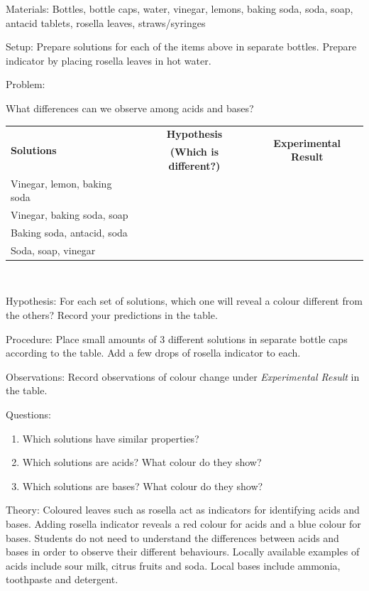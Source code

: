 \begin{description*}
\item[Materials:]{Bottles, bottle caps, water, vinegar, lemons, baking soda, soda, soap, antacid tablets, rosella leaves, straws/syringes}
\item[Setup:]{Prepare solutions for each of the items above in separate bottles. Prepare indicator by placing rosella leaves in hot water.}\\
\item[Problem:]{What differences can we observe among acids and bases?\\

\begin{tabular}{|l|c|c|} \hline
\multirow{2}{*}{\textbf{Solutions}} & \textbf{Hypothesis} & \multirow{2}{*}{\textbf{Experimental Result}} \\
& \textbf{(Which is different?)} & \\ \hline
Vinegar, lemon, baking soda & & \\ \hline
Vinegar, baking soda, soap & & \\ \hline
Baking soda, antacid, soda & & \\ \hline
Soda, soap, vinegar & & \\ \hline
\end{tabular} \\[10pt]
}
\item[Hypothesis:]{For each set of solutions, which one will reveal a colour different from the others? Record your predictions in the table.}
\item[Procedure:]{Place small amounts of 3 different solutions in separate bottle caps according to the table. Add a few drops of rosella indicator to each.}
\item[Observations:]{Record observations of colour change under \emph{Experimental Result} in the table.}
\item[Questions:]{\hfill
\begin{enumerate}
\item Which solutions have similar properties?
\item Which solutions are acids? What colour do they show?
\item Which solutions are bases? What colour do they show?
\end{enumerate}
}
\item[Theory:]{Coloured leaves such as rosella act as indicators for identifying acids and bases. Adding rosella indicator reveals a red colour for acids and a blue colour for bases. Students do not need to understand the differences between acids and bases in order to observe their different behaviours. Locally available examples of acids include sour milk, citrus fruits and soda. Local bases include ammonia, toothpaste and detergent.}
\end{description*}

